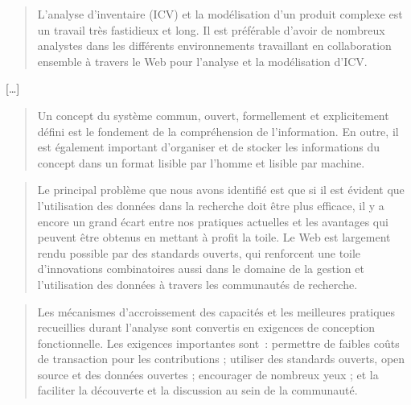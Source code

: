 \blockcquote[traduction]{zhang_lca-oriented_2015}{
L'analyse d'inventaire (ICV) et la modélisation d'un produit complexe est un travail très fastidieux et long.
Il est préférable d'avoir de nombreux analystes dans les différents environnements travaillant en collaboration ensemble à travers le Web pour l'analyse et la modélisation d'ICV.}
[\ldots]

\blockcquote[traduction]{zhang_lca-oriented_2015}{
Un concept du système commun, ouvert, formellement et explicitement défini est le fondement de la compréhension de l'information.
En outre, il est également important d'organiser et de stocker les informations du concept dans un format lisible par l'homme et lisible par machine.
%
%
}

\blockcquote[traduction de la conclusion sur la problématique p.232]{davis_making_2012}{
Le principal problème que nous avons identifié est que si il est évident que l'utilisation des données dans la recherche doit être plus efficace, il y a encore un grand écart entre nos pratiques actuelles et les avantages qui peuvent être obtenus en mettant à profit la toile.
Le Web est largement rendu possible par des standards ouverts, qui renforcent une toile d'innovations combinatoires aussi dans le domaine de la gestion et l'utilisation des données à travers les communautés de recherche.
}

\blockcquote[traduction de la conclusion sur les résultats p.234]{davis_making_2012}{
Les mécanismes d’accroissement des capacités et les meilleures pratiques recueillies durant l'analyse sont convertis en exigences de conception fonctionnelle.
Les exigences importantes sont~: permettre de faibles coûts de transaction pour les contributions ; utiliser des standards ouverts, open source et des données ouvertes ; encourager de nombreux yeux ; et la faciliter la découverte et la discussion au sein de la communauté.
%
}


